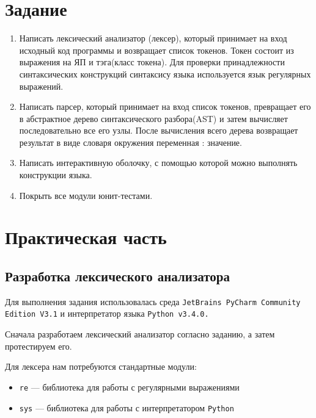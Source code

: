 \documentclass[a4paper,12pt]{article}
\begin{document}
\section{Задание}
\begin{enumerate}
	\item Написать лексический анализатор (лексер), который принимает на вход исходный код программы и возвращает список токенов. Токен состоит из выражения на ЯП и тэга(класс токена). Для проверки принадлежности синтаксических конструкций синтаксису языка используется язык регулярных выражений.\\
	\item Написать парсер, который принимает на вход список токенов, превращает его в абстрактное дерево синтаксического разбора(AST) и затем вычисляет последовательно все его узлы. После вычисления всего дерева возвращает результат в виде словаря окружения {переменная : значение}.
	\item Написать интерактивную оболочку, с помощью которой можно выполнять конструкции языка.
	\item Покрыть все модули юнит-тестами.
\end{enumerate}

\section{Практическая часть}

\subsection{Разработка лексического анализатора}
\par Для выполнения задания использовалась среда \verb|JetBrains PyCharm Community| \\ \verb|Edition V3.1| и интерпретатор языка \verb|Python v3.4.0.|\\

\par Сначала разработаем лексический анализатор согласно заданию, а затем протестируем его.

Для лексера нам потребуются стандартные модули:
\begin{itemize}
\item \verb|re| --- библиотека для работы с регулярными выражениями
\item \verb|sys| --- библиотека для работы с интерпретатором \verb|Python|\\
\end{itemize} 
\end{document}
